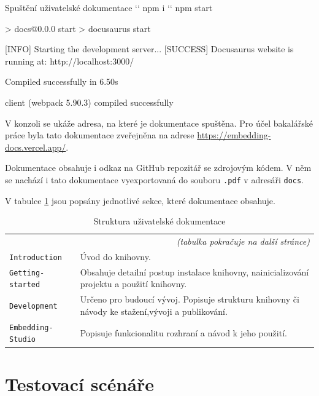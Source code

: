 \documentclass[czech, bc, kiv, he, iso690numb]{fasthesis}
\begin{document}
\begin{console}{Spuštění uživatelské dokumentace}
`\winprompt` npm i
`\winprompt` npm start

> docs@0.0.0 start
> docusaurus start

[INFO] Starting the development server...
[SUCCESS] Docusaurus website is running at: http://localhost:3000/

 Compiled successfully in 6.50s

client (webpack 5.90.3) compiled successfully
\end{console}

V konzoli se ukáže adresa, na které je dokumentace spuštěna. Pro účel bakalářské práce byla tato dokumentace
zveřejněna na adrese \url{https://embedding-docs.vercel.app/}. 

Dokumentace obsahuje i odkaz na GitHub repozitář se zdrojovým kódem. V něm se nachází i tato dokumentace vyexportovaná do souboru \texttt{.pdf} v adresáři \texttt{docs}. 

V tabulce \ref{tab:docsTabs} jsou popsány jednotlivé sekce, které dokumentace obsahuje.

\begin{center}
	\begin{longtable}{p{}p{}}
	\caption{Struktura uživatelské dokumentace}
	\label{tab:docsTabs}\\
	\toprule[1.5pt]
	\endhead
	\midrule
	\multicolumn{2}{r}{\textit{(tabulka pokračuje na další stránce)}}\\
	\endfoot
	\bottomrule[1.5pt]
	\endlastfoot
	\verb"Introduction" & Úvod do knihovny. \\
	\midrule
	\verb"Getting-started" & Obsahuje detailní postup instalace knihovny, nainicializování projektu a použití knihovny. \\
	\midrule
	\verb"Development" & Určeno pro budoucí vývoj. Popisuje strukturu knihovny či návody ke stažení,vývoji a publikování.\\
	\midrule
	\verb"Embedding-Studio" & Popisuje funkcionalitu rozhraní a návod k jeho použití. \\
	\end{longtable}
\end{center}

\chapter{Testovací scénáře}\label{app:testCases}
\end{document}
